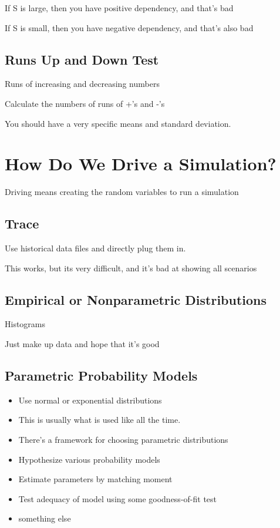 \documentclass[fleqn]{report}
\begin{document}
If S is large, then you have positive dependency, and that's bad 

If S is small, then you have negative dependency, and that's also bad 

\subsection{Runs Up and Down Test}
Runs of increasing and decreasing numbers 

Calculate the numbers of runs of +'s and -'s 

You should have a very specific means and standard deviation. 

\section{How Do We Drive a Simulation?}
Driving means creating the random variables to run a simulation 

\subsection{Trace}
Use historical data files and directly plug them in. 

This works, but its very difficult, and it's bad at showing all scenarios 

\subsection{Empirical or Nonparametric Distributions}
Histograms 

Just make up data and hope that it's good 

\subsection{Parametric Probability Models}
\begin{itemize}
    \item
    Use normal or exponential distributions
    \item
    This is usually what is used like all the time. 
    \item
    There's a framework for choosing parametric distributions 
    \item
    Hypothesize various probability models 
    \item
    Estimate parameters by matching moment 
    \item
    Test adequacy of model using some goodness-of-fit test 
    \item
    something else 
\end{itemize}
\end{document}
